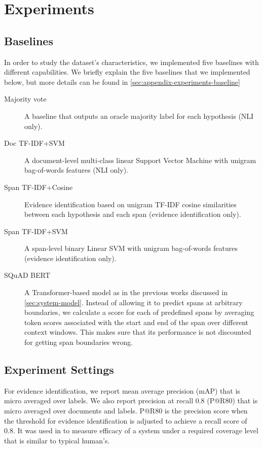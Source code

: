 \section{Experiments}\label{sec:experiment}

\subsection{Baselines}\label{sec:baselines}

In order to study the dataset's characteristics, we implemented five baselines with different capabilities.
We briefly explain the five baselines that we implemented below, but more details can be found in \cref{sec:appendix-experiments-baseline}

\begin{description}
    \item[Majority vote] A baseline that outputs an oracle majority label for each hypothesis (NLI only).
    \item[Doc TF-IDF+SVM] A document-level multi-class linear Support Vector Machine \cite[SVM;][]{chang_libsvm_2011} with unigram bag-of-words features (NLI only).
    \item[Span TF-IDF+Cosine] Evidence identification based on unigram TF-IDF cosine similarities between each hypothesis and each span  (evidence identification only).
    \item[Span TF-IDF+SVM] A span-level binary Linear SVM with unigram bag-of-words features  (evidence identification only).
    \item[SQuAD BERT] A Transformer-based model as in the previous works discussed in \cref{sec:system-model}.
    Instead of allowing it to predict spans at arbitrary boundaries, we calculate a score for each of predefined spans by averaging token scores associated with the start and end of the span over different context windows.
    This makes sure that its performance is not discounted for getting span boundaries wrong.
\end{description}

\subsection{Experiment Settings}\label{sec:experiment-settings}

For evidence identification, we report mean average precision (mAP) that is micro averaged over labels.
We also report precision at recall 0.8 (P@R80) that is micro averaged over documents and labels.
P@R80 is the precision score when the threshold for evidence identification is adjusted to achieve a recall score of 0.8.
It was used in \cite{hendrycks_cuad_2021} to measure efficacy of a system under a required coverage level that is similar to typical human's.

